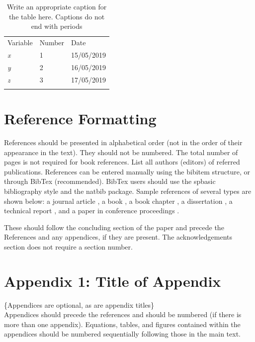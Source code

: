 \begin{table}
\caption{Write an appropriate caption for the table here. Captions do not end with periods}
\label{tab:1}
\begin{tabular}{lll}
\hline\noalign{\smallskip}
Variable & Number & Date  \\
\noalign{\smallskip}\hline\noalign{\smallskip}
\textit{x} & 1 & 15/05/2019 \\
\textit{y} & 2 & 16/05/2019 \\
\textit{z} & 3 & 17/05/2019 \\
\noalign{\smallskip}\hline
\end{tabular}
\end{table}


\section{Reference Formatting}
References should be presented in alphabetical order (not in the order of their appearance in the text). They should not be numbered. The total number of pages is not required for book references. List all authors (editors) of referred publications. References can be entered manually using the bibitem structure, or through BibTex (recommended). BibTex users should use the spbasic bibliography style and the natbib package. Sample references of several types are shown below: a journal article \citep{Mason+1987}, a book \citep{Garratt1994}, a book chapter \citep{Wyngaard2004}, a dissertation \citep{Fedorovich1986,Salesky2014}, a technical report \citep{Newsom++2015}, and a paper in conference proceedings \citep{Kaimal1979,Batchvarova+2003, Marusic++2011}.


\begin{acknowledgements}
These should follow the concluding section of the paper and precede the References and any appendices, if they are present. The acknowledgements section does not require a section number.
\end{acknowledgements}

\section*{Appendix 1: Title of Appendix}
\{Appendices are optional, as are appendix titles\}\\
Appendices should precede the references and should be numbered (if there is more than one appendix). Equations, tables, and figures contained within the appendices should be numbered sequentially following those in the main text.





